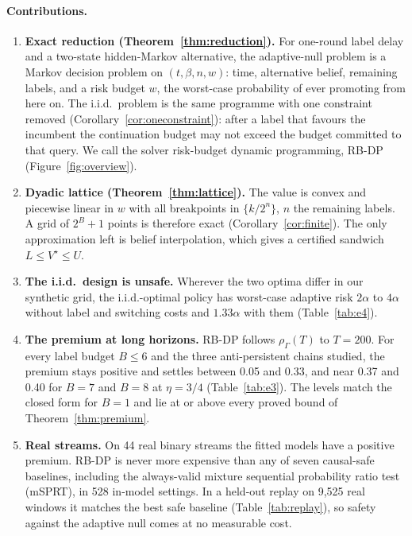 \documentclass{article}
\theoremstyle{plain}
\theoremstyle{definition}
\theoremstyle{remark}
\newcommand{\rhoG}{\rho_\Gamma}
\begin{document}
\paragraph{Contributions.}
\begin{enumerate}[leftmargin=*,itemsep=1pt,topsep=2pt]
\item \textbf{Exact reduction (Theorem~\ref{thm:reduction}).} For one-round label delay and a two-state hidden-Markov alternative, the adaptive-null problem is a Markov decision problem on $(t,\beta,n,w)$: time, alternative belief, remaining labels, and a risk budget $w$, the worst-case probability of ever promoting from here on. The i.i.d.\ problem is the same programme with one constraint removed (Corollary~\ref{cor:oneconstraint}): after a label that favours the incumbent the continuation budget may not exceed the budget committed to that query. We call the solver risk-budget dynamic programming, RB-DP (Figure~\ref{fig:overview}).
\item \textbf{Dyadic lattice (Theorem~\ref{thm:lattice}).} The value is convex and piecewise linear in $w$ with all breakpoints in $\{k/2^n\}$, $n$ the remaining labels. A grid of $2^B+1$ points is therefore exact (Corollary~\ref{cor:finite}). The only approximation left is belief interpolation, which gives a certified sandwich $L\le V^\star\le U$.
\item \textbf{The i.i.d.\ design is unsafe.} Wherever the two optima differ in our synthetic grid, the i.i.d.-optimal policy has worst-case adaptive risk $2\alpha$ to $4\alpha$ without label and switching costs and $1.33\alpha$ with them (Table~\ref{tab:e4}).
\item \textbf{The premium at long horizons.} RB-DP follows $\rhoG(T)$ to $T=200$. For every label budget $B\le 6$ and the three anti-persistent chains studied, the premium stays positive and settles between 0.05 and 0.33, and near 0.37 and 0.40 for $B=7$ and $B=8$ at $\eta=3/4$ (Table~\ref{tab:e3}). The levels match the closed form for $B=1$ and lie at or above every proved bound of Theorem~\ref{thm:premium}.
\item \textbf{Real streams.} On 44 real binary streams the fitted models have a positive premium. RB-DP is never more expensive than any of seven causal-safe baselines, including the always-valid mixture sequential probability ratio test (mSPRT), in 528 in-model settings. In a held-out replay on 9{,}525 real windows it matches the best safe baseline (Table~\ref{tab:replay}), so safety against the adaptive null comes at no measurable cost.
\end{enumerate}
\end{document}

